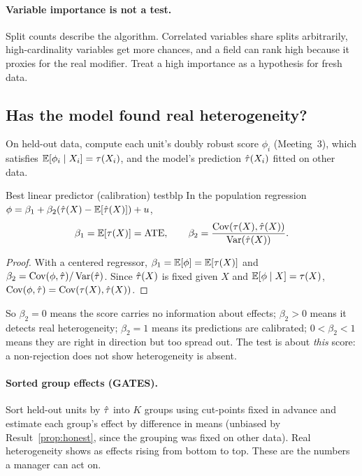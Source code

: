 \documentclass[11pt]{article}
\begin{document}
\paragraph{Variable importance is not a test.} Split counts describe the algorithm. Correlated variables share
splits arbitrarily, high-cardinality variables get more chances, and a field can rank high because it proxies
for the real modifier. Treat a high importance as a hypothesis for fresh data.

\subsection{Has the model found real heterogeneity?}

On held-out data, compute each unit's doubly robust score $\phi_i$ (Meeting~3), which satisfies
$\mathbb{E}[\phi_i \mid X_i] = \tau(X_i)$, and the model's prediction $\hat{\tau}(X_i)$ fitted on other data.

\begin{prop}{Best linear predictor (calibration) test}{blp}
In the population regression $\phi = \beta_1 + \beta_2(\hat{\tau}(X) - \mathbb{E}[\hat{\tau}(X)]) + u$,
\[
  \beta_1 = \mathbb{E}[\tau(X)] = \text{ATE}, \qquad \beta_2 = \frac{\operatorname{Cov}(\tau(X), \hat{\tau}(X))}{\operatorname{Var}(\hat{\tau}(X))}.
\]
\end{prop}
\begin{proof}
With a centered regressor, $\beta_1 = \mathbb{E}[\phi] = \mathbb{E}[\tau(X)]$ and $\beta_2 = \operatorname{Cov}(\phi, \hat{\tau})/\operatorname{Var}(\hat{\tau})$. Since
$\hat{\tau}(X)$ is fixed given $X$ and $\mathbb{E}[\phi \mid X] = \tau(X)$, $\operatorname{Cov}(\phi, \hat{\tau}) = \operatorname{Cov}(\tau(X), \hat{\tau}(X))$.
\end{proof}

So $\beta_2 = 0$ means the score carries no information about effects; $\beta_2 > 0$ means it detects real
heterogeneity; $\beta_2 = 1$ means its predictions are calibrated; $0 < \beta_2 < 1$ means they are right in
direction but too spread out. The test is about \emph{this} score: a non-rejection does not show heterogeneity
is absent.

\paragraph{Sorted group effects (GATES).} Sort held-out units by $\hat{\tau}$ into $K$ groups using cut-points fixed in
advance and estimate each group's effect by difference in means (unbiased by Result~\ref{prop:honest}, since the
grouping was fixed on other data). Real heterogeneity shows as effects rising from bottom to top. These are the
numbers a manager can act on.
\end{document}
